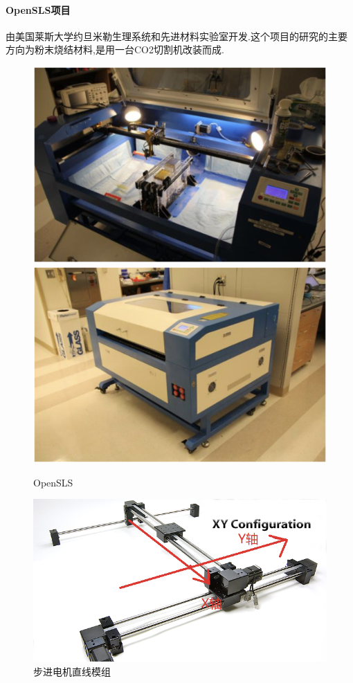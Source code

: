 \documentclass[a4paper,12pt,onecolumn,twoside]{article}
\begin{document}
\paragraph{OpenSLS项目}
由美国莱斯大学约旦米勒生理系统和先进材料实验室开发.这个项目的研究的主要方向为粉末烧结材料,是用一台CO2切割机改装而成.
\begin{figure}[ht]
\centering     
\includegraphics[width=0.8\linewidth]{OpenSLS0.png}
\centering
\includegraphics[width=0.8\linewidth]{OpenSLS1.png}
\caption{OpenSLS}
\end{figure}
\newpage

\begin{figure}[ht]
\centering
\includegraphics[width=0.9\linewidth]{OpenSLS2.png}
\caption{步进电机直线模组}
\end{figure}
\end{document}
